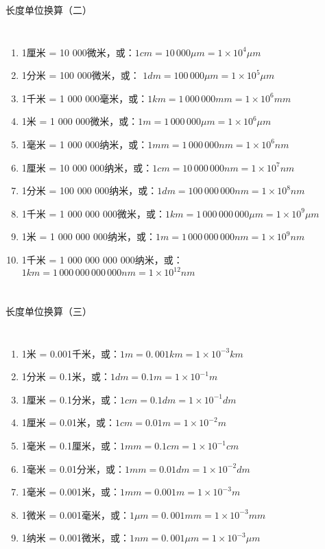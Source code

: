 \documentclass[aspectratio=169]{ctexbeamer} %
\begin{document}
\begin{frame}[t]{长度单位换算（二）}
\begin{columns}
\begin{enumerate}[label={\Alph*.}]
\item 1厘米 = 10 000微米，或：$1 cm = 10 \, 000 \mu m = 1 \times 10^4 \mu m$ \pause
\item 1分米 = 100 000微米，或： $1 dm = 100 \, 000 \mu m = 1 \times 10^5 \mu m$ \pause
\item 1千米 = 1 000 000毫米，或：$1 km = 1 \, 000 \, 000 mm = 1 \times 10^6 mm$ \pause
\item 1米 = 1 000 000微米，或：$1 m = 1 \, 000 \, 000 \mu m = 1 \times 10^6 \mu m$ \pause
\item 1毫米 = 1 000 000纳米，或：$1 mm = 1 \, 000 \, 000 nm = 1 \times 10^6 nm$ \pause
\item 1厘米 = 10 000 000纳米，或：$1 cm = 10 \, 000 \, 000 nm = 1 \times 10^7 nm$ \pause
\item 1分米 = 100 000 000纳米，或：$1 dm = 100 \, 000 \, 000 nm = 1 \times 10^8 nm$ \pause
\item 1千米 = 1 000 000 000微米，或：$1 km = 1 \, 000 \, 000 \, 000 \mu m = 1 \times 10^9 \mu m$ \pause
\item 1米 = 1 000 000 000纳米，或：$1 m = 1 \, 000 \, 000 \, 000 nm = 1 \times 10^9 nm$ \pause
\item 1千米 = 1 000 000 000 000纳米，或：$1 km = 1 \, 000 \, 000 \, 000 \, 000 nm = 1 \times 10^{12} nm$ \pause
\end{enumerate}
\end{columns}
\end{frame}

\begin{frame}[t]{长度单位换算（三）}
\begin{columns}
\begin{enumerate}[label={\Alph*.}]
\item 1米 = 0.001千米，或：$1 m = 0. \, 001 km = 1 \times 10^{-3} km$ \pause
\item 1分米 = 0.1米，或：$1 dm = 0.1 m = 1 \times 10^{-1} m$ \pause
\item 1厘米 = 0.1分米，或：$1 cm = 0.1 dm = 1 \times 10^{-1} dm$ \pause
\item 1厘米 = 0.01米，或：$1 cm = 0.01 m = 1 \times 10^{-2} m$ \pause
\item 1毫米 = 0.1厘米，或：$1 mm = 0.1 cm = 1 \times 10^{-1} cm$ \pause
\item 1毫米 = 0.01分米，或：$1 mm = 0.01 dm = 1 \times 10^{-2} dm$ \pause
\item 1毫米 = 0.001米，或：$1 mm = 0.001 m = 1 \times 10^{-3} m$ \pause
\item 1微米 = 0.001毫米，或：$1 \mu m = 0. \, 001 mm = 1 \times 10^{-3} mm$ \pause
\item 1纳米 = 0.001微米，或：$1 nm = 0. \, 001 \mu m = 1 \times 10^{-3} \mu m$ \pause
\end{enumerate}
\end{columns}
\end{frame}
\end{document}
